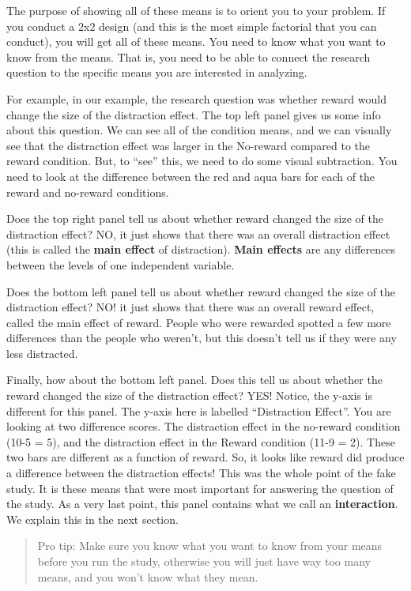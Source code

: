 \documentclass[
]{book}
\begin{document}
The purpose of showing all of these means is to orient you to your problem. If you conduct a 2x2 design (and this is the most simple factorial that you can conduct), you will get all of these means. You need to know what you want to know from the means. That is, you need to be able to connect the research question to the specific means you are interested in analyzing.

For example, in our example, the research question was whether reward would change the size of the distraction effect. The top left panel gives us some info about this question. We can see all of the condition means, and we can visually see that the distraction effect was larger in the No-reward compared to the reward condition. But, to ``see'' this, we need to do some visual subtraction. You need to look at the difference between the red and aqua bars for each of the reward and no-reward conditions.

Does the top right panel tell us about whether reward changed the size of the distraction effect? NO, it just shows that there was an overall distraction effect (this is called the \textbf{main effect} of distraction). \textbf{Main effects} are any differences between the levels of one independent variable.

Does the bottom left panel tell us about whether reward changed the size of the distraction effect? NO! it just shows that there was an overall reward effect, called the main effect of reward. People who were rewarded spotted a few more differences than the people who weren't, but this doesn't tell us if they were any less distracted.

Finally, how about the bottom left panel. Does this tell us about whether the reward changed the size of the distraction effect? YES! Notice, the y-axis is different for this panel. The y-axis here is labelled ``Distraction Effect''. You are looking at two difference scores. The distraction effect in the no-reward condition (10-5 = 5), and the distraction effect in the Reward condition (11-9 = 2). These two bars are different as a function of reward. So, it looks like reward did produce a difference between the distraction effects! This was the whole point of the fake study. It is these means that were most important for answering the question of the study. As a very last point, this panel contains what we call an \textbf{interaction}. We explain this in the next section.

\begin{quote}
Pro tip: Make sure you know what you want to know from your means before you run the study, otherwise you will just have way too many means, and you won't know what they mean.
\end{quote}
\end{document}
